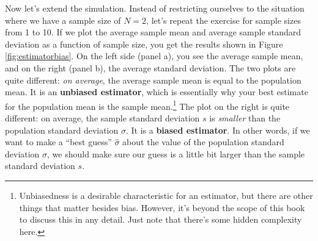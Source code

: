 \documentclass[
  11pt,
  a4paper,
  twoside,symmetric,openright]{book}
\theoremstyle{break}
\theoremstyle{break}
\begin{document}
Now let's extend the simulation. Instead of restricting ourselves to the situation where we have a sample size of \(N=2\), let's repeat the exercise for sample sizes from 1 to 10. If we plot the average sample mean and average sample standard deviation as a function of sample size, you get the results shown in Figure \ref{fig:estimatorbias}. On the left side (panel a), you see the average sample mean, and on the right (panel b), the average standard deviation. The two plots are quite different: \emph{on average}, the average sample mean is equal to the population mean. It is an \textbf{unbiased estimator}, which is essentially why your best estimate for the population mean is the sample mean.\footnote{Unbiasedness is a desirable characteristic for an estimator, but there are other things that matter besides bias. However, it's beyond the scope of this book to discuss this in any detail. Just note that there's some hidden complexity here.} The plot on the right is quite different: on average, the sample standard deviation \(s\) is \emph{smaller} than the population standard deviation \(\sigma\). It is a \textbf{biased estimator}. In other words, if we want to make a ``best guess'' \(\hat\sigma\) about the value of the population standard deviation \(\sigma\), we should make sure our guess is a little bit larger than the sample standard deviation \(s\).
\end{document}
